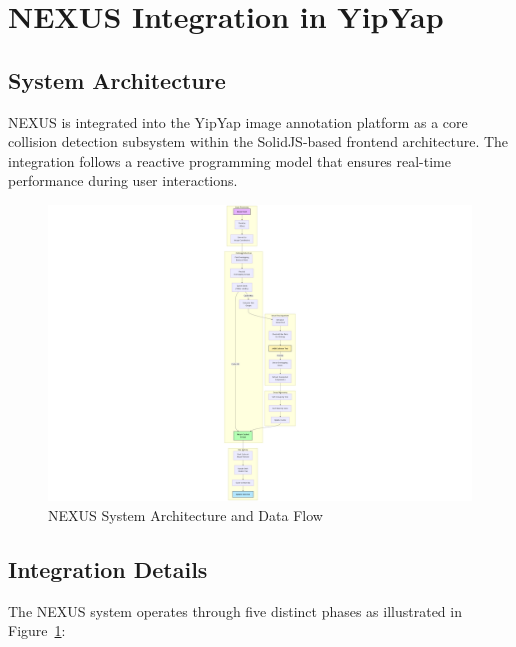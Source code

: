 \documentclass[10pt]{article}
\begin{document}
\section{NEXUS Integration in YipYap}

\subsection{System Architecture}
NEXUS is integrated into the YipYap image annotation platform as a core collision detection subsystem within the SolidJS-based frontend architecture. The integration follows a reactive programming model that ensures real-time performance during user interactions.

\begin{figure}[p]
\centering
\includegraphics[height=0.85\textheight,keepaspectratio]{BoundingBox.png}
\caption{NEXUS System Architecture and Data Flow}
\label{fig:nexus_architecture}
\end{figure}

\subsection{Integration Details}
The NEXUS system operates through five distinct phases as illustrated in 
Figure~\ref{fig:nexus_architecture}:
\end{document}
